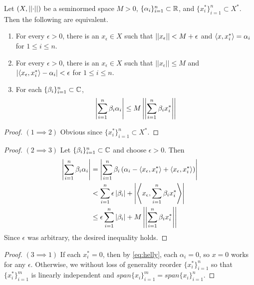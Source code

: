 \begin{thm}
    \label{thm:helly}
    Let $(X,\left|\left| \cdot \right|\right|)$ be a seminormed space $M>0$, $\{\alpha_i\}_{i=1}^n \subset \mathbb{R}$, and $\{x_i^*\}_{i=1}^n \subset X^*$. Then the following are equivalent. 
    \begin{enumerate}
        \item For every $\epsilon > 0$, there is an $x_\epsilon \in X$ such that $\left|\left| x_\epsilon \right|\right|< M+\epsilon$ and $\left\langle x,x_i^* \right\rangle=\alpha_i$ for $1 \leq i \leq n$. 
        \item For every $\epsilon > 0$, there is an $x_\epsilon \in X$ such that $||x_\epsilon|| \leq M$ and $\left| \left\langle x_\epsilon,x_i^* \right\rangle-\alpha_i \right|< \epsilon$ for $1 \leq i \leq n$. 
        \item For each $\{\beta_i\}_{i=1}^n \subset \mathbb{C}$, 
        \begin{equation}
            \label{eq:helly}
            \left| \sum_{i=1}^n \beta_i \alpha_i \right| \leq M\left|\left| \sum_{i=1}^n \beta_i x_i^* \right|\right|
        \end{equation}
    \end{enumerate}
    \begin{proof} $(1 \implies 2)$
        Obvious since $\{x_i^*\}_{i=1}^n \subset X^*$. 
    \end{proof}
    \begin{proof} $(2 \implies 3)$
        Let $\{\beta_i\}_{i=1}^n \subset \mathbb{C}$ and choose $\epsilon >0$. 
        Then
        \begin{equation}
            \begin{split}
                \left| \sum_{i=1}^n \beta_i \alpha_i  \right|&= \left|  \sum_{i=1}^n \beta_i \left(  \alpha_i-\left\langle x_\epsilon,x_i^* \right\rangle+\left\langle x_\epsilon,x_i^* \right\rangle\right) \right|\\
                & < \sum_{i=1}^n \epsilon \left| \beta_i \right| + \left|  \left\langle  x_{\epsilon} , \sum_{i=1}^n \beta_ix_i^* \right\rangle \right|\\
                & \leq \epsilon \sum_{i=1}^n \left| \beta_i \right| + M \left|\left| \sum_{i=1}^n \beta_i x_i^* \right|\right|
            \end{split} 
        \end{equation}
        Since $\epsilon$ was arbitrary, the desired inequality holds. 
    \end{proof} 
    \begin{proof} $(3 \implies 1)$
        If each $x_i^*=0$, then by    \ref{eq:helly}, each $\alpha_i=0$, so $x=0$ works for any $\epsilon$. 
        Otherwise, we without loss of generality reorder $\{x_i^*\}_{i=1}^n$ so that $\{x_i^*\}_{i=1}^m$ is linearly independent and $span\{x_i\}_{i=1}^m=span\{x_i\}_{i=1}^n$. 

\end{proof}
\end{thm}
